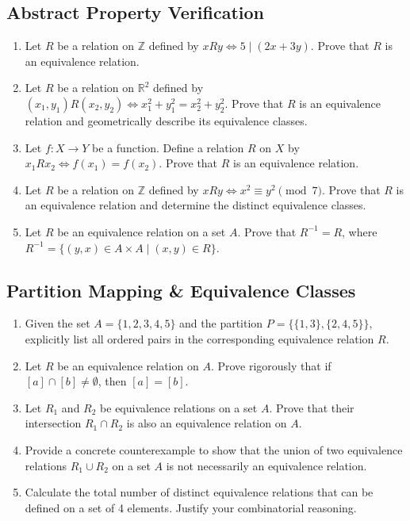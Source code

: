 \documentclass[11pt, a4paper]{article}
\theoremstyle{definition}
\theoremstyle{remark}
\newcommand{\R}{\mathbb{R}}
\newcommand{\Z}{\mathbb{Z}}
\begin{document}
\subsection{Abstract Property Verification}
\begin{enumerate}[label=\textbf{\arabic*.}]
    \item Let $R$ be a relation on $\Z$ defined by $xRy \iff 5 \mid (2x + 3y)$. Prove that $R$ is an equivalence relation.
    \item Let $R$ be a relation on $\R^2$ defined by $(x_1, y_1) R (x_2, y_2) \iff x_1^2 + y_1^2 = x_2^2 + y_2^2$. Prove that $R$ is an equivalence relation and geometrically describe its equivalence classes.
    \item Let $f: X \to Y$ be a function. Define a relation $R$ on $X$ by $x_1 R x_2 \iff f(x_1) = f(x_2)$. Prove that $R$ is an equivalence relation.
    \item Let $R$ be a relation on $\Z$ defined by $xRy \iff x^2 \equiv y^2 \pmod 7$. Prove that $R$ is an equivalence relation and determine the distinct equivalence classes.
    \item Let $R$ be an equivalence relation on a set $A$. Prove that $R^{-1} = R$, where $R^{-1} = \{(y, x) \in A \times A \mid (x, y) \in R\}$.
\end{enumerate}

\subsection{Partition Mapping \& Equivalence Classes}
\begin{enumerate}[label=\textbf{\arabic*.}, start=6]
    \item Given the set $A = \{1, 2, 3, 4, 5\}$ and the partition $P = \{\{1, 3\}, \{2, 4, 5\}\}$, explicitly list all ordered pairs in the corresponding equivalence relation $R$.
    \item Let $R$ be an equivalence relation on $A$. Prove rigorously that if $[a] \cap [b] \neq \emptyset$, then $[a] = [b]$.
    \item Let $R_1$ and $R_2$ be equivalence relations on a set $A$. Prove that their intersection $R_1 \cap R_2$ is also an equivalence relation on $A$.
    \item Provide a concrete counterexample to show that the union of two equivalence relations $R_1 \cup R_2$ on a set $A$ is not necessarily an equivalence relation.
    \item Calculate the total number of distinct equivalence relations that can be defined on a set of 4 elements. Justify your combinatorial reasoning.
\end{enumerate}
\end{document}
